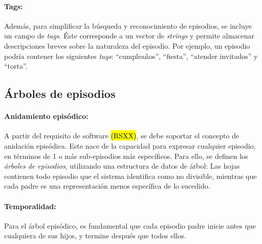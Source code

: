 \paragraph{Tags:}
Además, para simplificar la búsqueda y reconocimiento de episodios, se incluye un campo de \textit{tags}. Éste corresponde a un vector de \textit{strings} y permite almacenar descripciones breves sobre la naturaleza del episodio. Por ejemplo, un episodio podría contener los siguientes \textit{tags}: ``cumpleaños'', ``fiesta'', ``atender invitados'' y ``torta''.

 
\subsection{Árboles de episodios}



\paragraph{Anidamiento episódico:}
A partir del requisito de software \hl{(RSXX)}, se debe soportar el concepto de anidación episódica. Este nace de la capacidad para expresar cualquier episodio, en términos de 1 o más sub-episodios más específicos. Para ello, se definen los \textit{árboles de episodios}, utilizando una estructura de datos de árbol: Las hojas contienen todo episodio que el sistema identifica como no divisible, mientras que cada padre es una representación menos específica de lo sucedido.

\paragraph{Temporalidad:}
Para el árbol episódico, es fundamental que cada episodio padre inicie antes que cualquiera de sus hijos, y termine después que todos ellos. 

